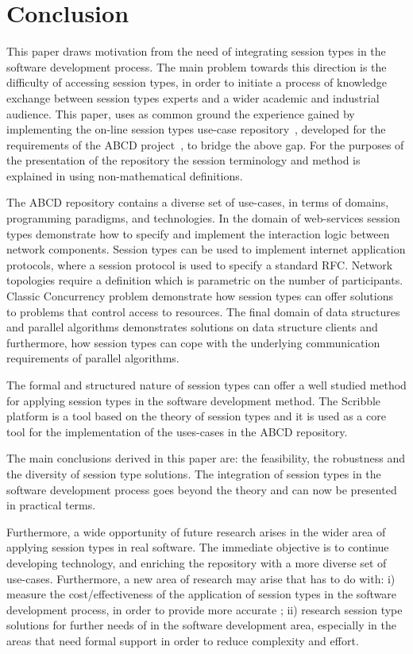 \section{Conclusion}
\label{sec:conclusion}

This paper draws motivation from the need
of integrating session types in the software
development process. The main problem towards
this direction is the difficulty of accessing
session types, in order to initiate a process
of knowledge exchange between session types
experts and a wider academic and industrial
audience. This paper, uses as common ground
the experience gained by implementing
the on-line session types use-case
repository~\cite{usecase_repository}, developed for the
requirements of the ABCD project~\cite{ABCD},
to bridge the above gap. For the purposes of
the presentation of the repository the session terminology
and method is explained in using non-mathematical
definitions.

The ABCD repository contains a 
diverse set of use-cases, in terms of domains,
programming paradigms, and technologies.
In the domain of web-services session types
demonstrate how to specify and implement
the interaction logic between network components.
Session types can be used to implement internet
application protocols, where a session protocol
is used to specify a standard RFC. Network topologies
require a definition which is parametric on the number
of participants. Classic Concurrency problem demonstrate
how session types can offer solutions to problems
that control access to resources. The final domain
of data structures and parallel algorithms demonstrates
solutions on data structure clients and furthermore,
how session types can cope with the underlying communication
requirements of parallel algorithms.

The formal and structured nature of session types
can offer a well studied method for applying 
session types in the software development method.
The Scribble platform is a tool based on the
theory of session types and it is used as
a core tool 
for the implementation of the uses-cases in the
ABCD repository.

The main conclusions derived in this paper are: the feasibility,
the robustness and the diversity of session type solutions.
The integration of session types in the software development
process goes beyond the theory and can now be presented
in practical terms.

Furthermore, a wide opportunity of future research arises
in the wider area of applying session types in real software.
The immediate objective is to continue developing technology,
and enriching the repository with a more diverse set of
use-cases.
Furthermore, a new area of research may arise that has to
do with: i) measure the cost/effectiveness of the
application of session types in
the software development process, in order to provide
more accurate ; ii) research session type solutions for
further needs of in the software development area, especially
in the areas that need formal support in order to reduce
complexity and effort.
